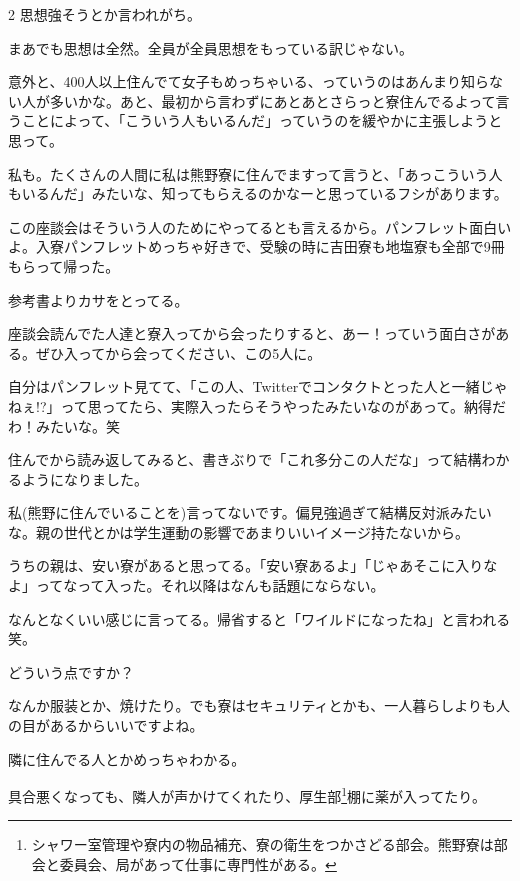 \begin{multicols}{2}
 思想強そうとか言われがち。

 まあでも思想は全然。全員が全員思想をもっている訳じゃない。

 意外と、400人以上住んでて女子もめっちゃいる、っていうのはあんまり知らない人が多いかな。あと、最初から言わずにあとあとさらっと寮住んでるよって言うことによって、「こういう人もいるんだ」っていうのを緩やかに主張しようと思って。

 私も。たくさんの人間に私は熊野寮に住んでますって言うと、「あっこういう人もいるんだ」みたいな、知ってもらえるのかなーと思っているフシがあります。

 この座談会はそういう人のためにやってるとも言えるから。パンフレット面白いよ。入寮パンフレットめっちゃ好きで、受験の時に吉田寮も地塩寮も全部で9冊もらって帰った。

 参考書よりカサをとってる。

 座談会読んでた人達と寮入ってから会ったりすると、あー！っていう面白さがある。ぜひ入ってから会ってください、この5人に。

 自分はパンフレット見てて、「この人、Twitterでコンタクトとった人と一緒じゃねぇ!?」って思ってたら、実際入ったらそうやったみたいなのがあって。納得だわ！みたいな。笑　

 住んでから読み返してみると、書きぶりで「これ多分この人だな」って結構わかるようになりました。


 私(熊野に住んでいることを)言ってないです。偏見強過ぎて結構反対派みたいな。親の世代とかは学生運動の影響であまりいいイメージ持たないから。

 うちの親は、安い寮があると思ってる。「安い寮あるよ」「じゃあそこに入りなよ」ってなって入った。それ以降はなんも話題にならない。

 なんとなくいい感じに言ってる。帰省すると「ワイルドになったね」と言われる笑。

 どういう点ですか？

 なんか服装とか、焼けたり。でも寮はセキュリティとかも、一人暮らしよりも人の目があるからいいですよね。

 隣に住んでる人とかめっちゃわかる。

 具合悪くなっても、隣人が声かけてくれたり、厚生部\footnote{シャワー室管理や寮内の物品補充、寮の衛生をつかさどる部会。熊野寮は部会と委員会、局があって仕事に専門性がある。}棚に薬が入ってたり。


\end{multicols}

